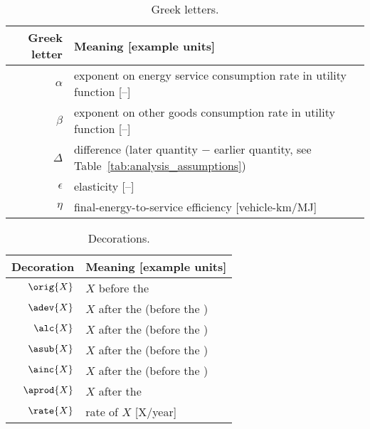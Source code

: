 \begin{table}
\centering %
\caption{Greek letters.}
\begin{tabular}{r l}
  \toprule
  Greek letter & Meaning [example units] \\
  \midrule
  $\alpha$ & exponent on energy service consumption rate in utility function [--] \\
  $\beta$  & exponent on other goods consumption rate in utility function [--] \\
  $\Delta$ & difference (later quantity $-$ earlier quantity, see Table~\ref{tab:analysis_assumptions}) \\
  $\epsilon$ & elasticity [--] \\
  $\eta$ & final-energy-to-service efficiency [vehicle-km/MJ] \\
  \bottomrule
\end{tabular}
\label{tab:greek}
\end{table}



\begin{table}
\centering %
\caption{Decorations.}
\begin{tabular}{r l}
  \toprule
  Decoration & Meaning [example units] \\
  \midrule
  $\orig{X}$ & $X$ before the \deveffect{} \\
  $\adev{X}$ & $X$ after the \deveffect{} (before the \lceffect{}) \\
  $\alc{X}$  & $X$ after the \lceffect{} (before the \subeffect{}) \\
  $\asub{X}$ & $X$ after the \subeffect{} (before the \inceffect{}) \\
  $\ainc{X}$ & $X$ after the \inceffect{} (before the \prodeffect{}) \\
  $\aprod{X}$ & $X$ after the \prodeffect{} \\
  $\rate{X}$ & rate of $X$ [X/year] \\
  \bottomrule
\end{tabular}
\label{tab:decorations}
\end{table}



